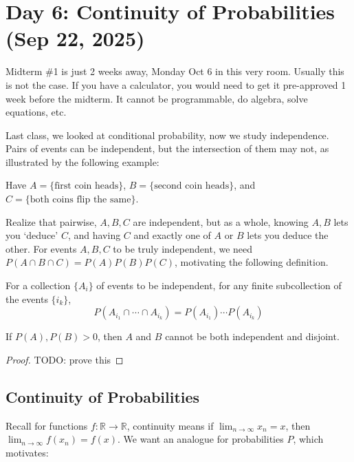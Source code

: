 \section{Day 6: Continuity of Probabilities (Sep 22, 2025)}

Midterm \#1 is just 2 weeks away, Monday Oct 6 in this very room. Usually this is not the case. If you have a calculator, you would need to get it pre-approved 1 week before the midterm. It cannot be programmable, do algebra, solve equations, etc.

Last class, we looked at conditional probability, now we study independence. Pairs of events can be independent, but the intersection of them may not, as illustrated by the following example:

\begin{example}
Have $A = \{ \text{first coin heads} \}$, $B = \{ \text{second coin heads} \}$, and $C = \{ \text{both coins flip the same} \}$.

Realize that pairwise, $A, B, C$ are independent, but as a whole, knowing $A, B$ lets you `deduce' $C$, and having $C$ and exactly one of $A$ or $B$ lets you deduce the other. For events $A, B, C$ to be truly independent, we need $P(A \cap B \cap C) = P(A) P(B) P(C)$, motivating the following definition.
\end{example}


\begin{definition}[Independence]
For a collection $\{ A_i \}$ of events to be independent, for any finite subcollection of the events $\{ i_k \}$, 
\[
    P(A_{i_1} \cap \cdots \cap A_{i_k}) = P(A_{i_1}) \cdots P(A_{i_k})
\]
\end{definition}

\begin{simplethm}
    If $P(A), P(B) > 0$, then $A$ and $B$ cannot be both independent and disjoint. 
\end{simplethm}

\begin{proof}
    TODO: prove this
\end{proof}

\subsection{Continuity of Probabilities}

Recall for functions $f : \mathbb{R} \to \mathbb{R}$, continuity means if $\displaystyle \lim_{ n \to \infty } x_n = x$, then $\displaystyle \lim_{ n \to \infty } f(x_n) = f(x)$. We want an analogue for probabilities $P$, which motivates:

